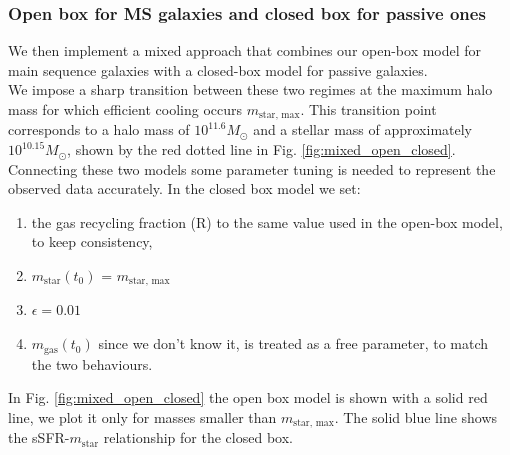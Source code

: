 \documentclass[fleqn,usenatbib]{mnras}
\begin{document}
\subsubsection{\textbf{Open box for MS galaxies and closed box for passive ones}}
We then implement a mixed approach that combines our open-box model for main sequence galaxies with a closed-box model for passive galaxies.\\
We impose a sharp transition between these two regimes at the maximum halo mass for which efficient cooling occurs $m_\text{star, max}$. This transition point corresponds to a halo mass of $10^{11.6} M_\odot$ and a stellar mass of approximately $10^{10.15} M_\odot$, shown by the red dotted line in Fig. \ref{fig:mixed_open_closed}.
Connecting these two models some parameter tuning is needed to represent the observed data accurately. 
In the closed box model we set:
\begin{enumerate}
    \item the gas recycling fraction (R) to the same value used in the open-box model, to keep consistency,
    \item $m_\text{star}(t_0)$ =  $m_\text{star, max}$
    \item $\epsilon = 0.01$
    \item $m_\text{gas}(t_0)$ since we don't know it, is treated as a free parameter, to match the two behaviours.
\end{enumerate}

In Fig. \ref{fig:mixed_open_closed} the open box model is shown with a solid red line, we plot it only for masses smaller than $m_\text{star, max}$. The solid blue line shows the sSFR-$m_\text{star}$ relationship for the closed box.
\end{document}
